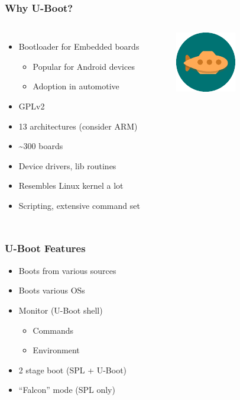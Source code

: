 \documentclass[aspectratio=169]{beamer}
\begin{document}
\begin{frame}
  \frametitle{Why U-Boot?}
  \begin{columns}
      \begin{itemize}
      \item Bootloader for Embedded boards
        \begin{itemize}
        \item Popular for Android devices
        \item Adoption in automotive
        \end{itemize}
      \item GPLv2
      \item 13 architectures (consider ARM)
      \item \textasciitilde 300 boards
      \item Device drivers, lib routines
      \item Resembles Linux kernel a lot
      \item Scripting, extensive command set
      \end{itemize}
      \begin{figure}[ht]
      \begin{center}
        \includegraphics[scale=2]{images/uboot-logo.pdf}
      \end{center}
      \end{figure}
  \end{columns}
\end{frame}

\begin{frame}
  \frametitle{U-Boot Features}
  \begin{itemize}
  \item Boots from various sources
  \item Boots various OSs
  \item Monitor (U-Boot shell)
    \begin{itemize}
    \item Commands
    \item Environment
    \end{itemize}
  \item 2 stage boot (SPL + U-Boot)
  \item ``Falcon'' mode (SPL only)
  \end{itemize}
\end{frame}
\end{document}

